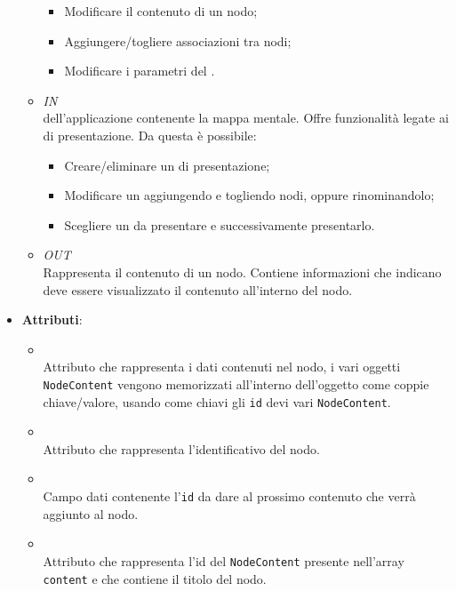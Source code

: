 \begin{itemize}
\begin{itemize}
\begin{itemize}
\item Modificare il contenuto di un nodo;
\item Aggiungere/togliere associazioni tra nodi;
\item Modificare i parametri del .
\end{itemize}
\item \textit{IN} \hyperref[\nogloxy{Premi::Front-End::Views::PathsEditorView}]{}\\
 dell’applicazione contenente la mappa mentale. Offre funzionalità legate ai  di presentazione.
Da questa  è possibile:
\begin{itemize}
\item Creare/eliminare un  di presentazione;
\item Modificare un  aggiungendo e togliendo nodi, oppure rinominandolo;
\item Scegliere un  da presentare e successivamente presentarlo.
\end{itemize}
\item \textit{OUT} \hyperref[\nogloxy{Premi::Front-End::Model::NodeContent}]{}\\
Rappresenta il contenuto di un nodo. Contiene informazioni che indicano deve essere visualizzato il contenuto all’interno del nodo.
\end{itemize}
\item \textbf{Attributi}:
\begin{itemize}
\item {}
\\ Attributo che rappresenta i dati contenuti nel nodo, i vari oggetti \texttt{NodeContent} vengono memorizzati all'interno dell'oggetto come coppie chiave/valore, usando come chiavi gli \texttt{id} devi vari \texttt{NodeContent}.
\item {}
\\ Attributo che rappresenta l'identificativo del nodo.
\item {}
\\ Campo dati contenente l'\texttt{id} da dare al prossimo contenuto che verrà aggiunto al nodo.
\item {}
\\ Attributo che rappresenta l'id del \texttt{NodeContent} presente nell'array \texttt{content} e che contiene il titolo del nodo.

\end{itemize}
\end{itemize}

